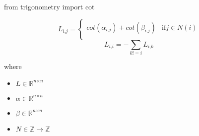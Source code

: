 \documentclass[12pt]{article}
\begin{document}
from trigonometry import cot

\[
\textit{L}_{\textit{i}, \textit{j}} = \begin{cases} cot(\textit{α}_{\textit{i}, \textit{j}}) + cot(\textit{β}_{\textit{i}, \textit{j}}) & \text{if}  \textit{j} \in \textit{N}(\textit{i})  \\ \end{cases} 
\]
\[
\textit{L}_{\textit{i}, \textit{i}} = -\sum_{\textit{k} != \textit{i}} \textit{L}_{\textit{i}, \textit{k}}
\]

where
\begin{itemize}
\item $\textit{L} \in \mathbb{R}^{ \textit{n} \times \textit{n} }$
\item $\textit{α} \in \mathbb{R}^{ \textit{n} \times \textit{n} }$
\item $\textit{β} \in \mathbb{R}^{ \textit{n} \times \textit{n} }$
\item $\textit{N} \in \mathbb{{Z}}\rightarrow \mathbb{Z}$
\end{itemize}
\end{document}
